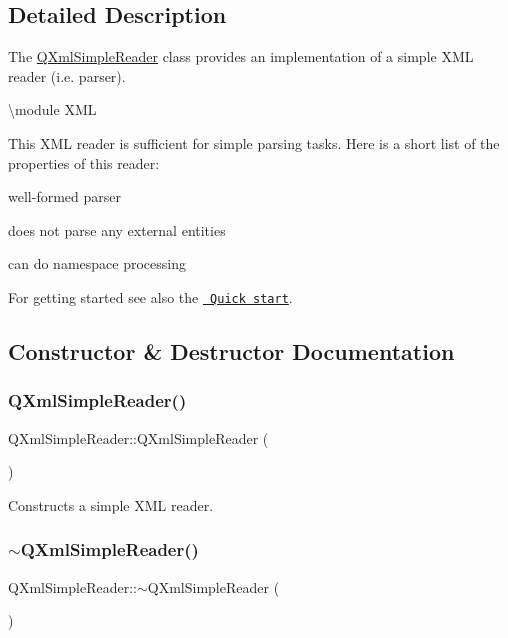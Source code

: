\subsection{Detailed Description}
The \mbox{\hyperlink{class_q_xml_simple_reader}{Q\+Xml\+Simple\+Reader}} class provides an implementation of a simple X\+ML reader (i.\+e. parser). 

\textbackslash{}module X\+ML

This X\+ML reader is sufficient for simple parsing tasks. Here is a short list of the properties of this reader\+: 
\begin{DoxyItemize}
\item well-\/formed parser 
\item does not parse any external entities 
\item can do namespace processing 
\end{DoxyItemize}

For getting started see also the \href{xml-sax.html\#quickStart}{\texttt{ Quick start}}. 

\subsection{Constructor \& Destructor Documentation}
\mbox{\label{class_q_xml_simple_reader_a4ec163c0a75baf6d86d7124550740372}} 
\subsubsection{\texorpdfstring{QXmlSimpleReader()}{QXmlSimpleReader()}}
{\footnotesize\ttfamily Q\+Xml\+Simple\+Reader\+::\+Q\+Xml\+Simple\+Reader (\begin{DoxyParamCaption}{ }\end{DoxyParamCaption})}

Constructs a simple X\+ML reader. \mbox{\label{class_q_xml_simple_reader_a9dba2992f2ef5fe07cd4846dfca0fbc6}} 
\subsubsection{\texorpdfstring{$\sim$QXmlSimpleReader()}{~QXmlSimpleReader()}}
{\footnotesize\ttfamily Q\+Xml\+Simple\+Reader\+::$\sim$\+Q\+Xml\+Simple\+Reader (\begin{DoxyParamCaption}{ }\end{DoxyParamCaption})\hspace{0.3cm}{\ttfamily [virtual]}}

